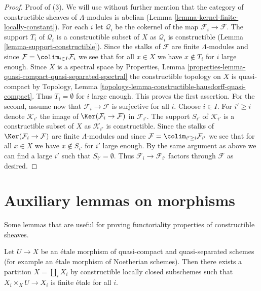 \begin{proof}
\medskip\noindent
Proof of (3). We will use without further mention that the category of
constructible sheaves of $\Lambda$-modules is abelian
(Lemma \ref{lemma-kernel-finite-locally-constant}).
For each $i$ let $\mathcal{Q}_i$ be the cokernel of the map
$\mathcal{F}_i \to \mathcal{F}$. The support $T_i$ of $\mathcal{Q}_i$
is a constructible subset of $X$ as $\mathcal{Q}_i$ is constructible
(Lemma \ref{lemma-support-constructible}).
Since the stalks of $\mathcal{F}$ are finite $\Lambda$-modules
and since $\mathcal{F} = \colim_{i \in I} \mathcal{F}_i$ we see
that for all $x \in X$ we have $x \not \in T_i$ for $i$ large enough.
Since $X$ is a spectral space by Properties, Lemma
\ref{properties-lemma-quasi-compact-quasi-separated-spectral}
the constructible topology on $X$ is quasi-compact by
Topology, Lemma \ref{topology-lemma-constructible-hausdorff-quasi-compact}.
Thus $T_i = \emptyset$ for $i$ large enough. This proves the first
assertion. For the second, assume now that
$\mathcal{F}_i \to \mathcal{F}$ is surjective for all $i$.
Choose $i \in I$. For $i' \geq i$ denote $\mathcal{K}_{i'}$ the
image of $\Ker(\mathcal{F}_i \to \mathcal{F})$ in $\mathcal{F}_{i'}$.
The support $S_{i'}$ of $\mathcal{K}_{i'}$
is a constructible subset of $X$ as $\mathcal{K}_{i'}$ is constructible.
Since the stalks of $\Ker(\mathcal{F}_i \to \mathcal{F})$
are finite $\Lambda$-modules and since
$\mathcal{F} = \colim_{i' \geq i} \mathcal{F}_{i'}$ we see
that for all $x \in X$ we have $x \not \in S_{i'}$ for $i'$ large enough.
By the same argument as above we can find a large $i'$ such
that $S_{i'} = \emptyset$. Thus $\mathcal{F}_i \to \mathcal{F}_{i'}$
factors through $\mathcal{F}$ as desired.
\end{proof}




\section{Auxiliary lemmas on morphisms}
\label{section-stratify-morphisms}

\noindent
Some lemmas that are useful for proving functoriality properties
of constructible sheaves.

\begin{lemma}
\label{lemma-etale-stratified-finite}
Let $U \to X$ be an \'etale morphism of quasi-compact and quasi-separated
schemes (for example an \'etale morphism of Noetherian schemes). Then there
exists a partition $X = \coprod_i X_i$ by constructible locally closed
subschemes such that $X_i \times_X U \to X_i$ is finite \'etale for all $i$.
\end{lemma}

